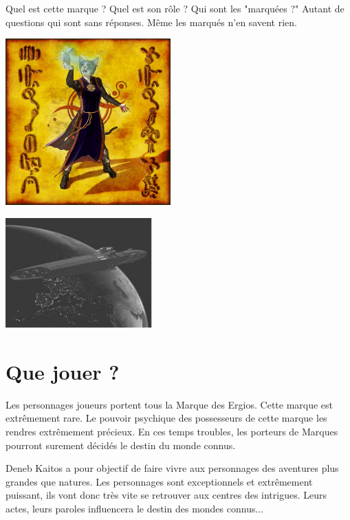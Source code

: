 \documentclass{DenebClass}
\begin{document}
\begin{multicols}{2}
Quel est cette marque ? Quel est son rôle ? Qui sont les "marquées ?" Autant de questions qui sont sans réponses. Même les marqués n'en savent rien. 


\begin{center}
	\includegraphics[width=180pt]{../Img/teldrim_psy}
\end{center}


\begin{center}
	\includegraphics[width=160pt]{../image/vaisseau1}
\end{center}

\section{Que jouer ?}

Les personnages joueurs portent tous la Marque des Ergios. Cette marque est extrêmement rare. Le pouvoir psychique des possesseurs de cette marque les rendres extrêmement précieux. En ces temps troubles, les porteurs de Marques pourront surement décidés le destin du monde connus.

Deneb Kaitos a pour objectif de faire vivre aux personnages des aventures plus grandes que natures. Les personnages sont exceptionnels et extrêmement puissant, ils vont donc très vite se retrouver aux centres des intrigues. Leurs actes, leurs paroles influencera le destin des mondes connus...

\end{multicols}
\end{document}
